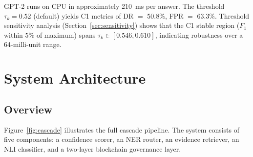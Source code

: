 \documentclass[11pt,a4paper]{article}
\newcommand{\fone}{F_1}
\newcommand{\tauK}{\tau_k}
\begin{document}
GPT-2 runs on CPU in approximately 210~ms per answer. The threshold
$\tauK = 0.52$ (default) yields C1 metrics of DR $=$ 50.8\%, FPR $=$ 63.3\%.
Threshold sensitivity analysis (Section~\ref{sec:sensitivity}) shows that the
C1 stable region ($\fone$ within 5\% of maximum) spans $\tauK \in [0.546,
0.610]$, indicating robustness over a 64-milli-unit range.

\section{System Architecture}
\label{sec:arch}

\subsection{Overview}

Figure~\ref{fig:cascade} illustrates the full cascade pipeline. The system
consists of five components: a confidence scorer, an NER router, an evidence
retriever, an NLI classifier, and a two-layer blockchain governance layer.
\end{document}
